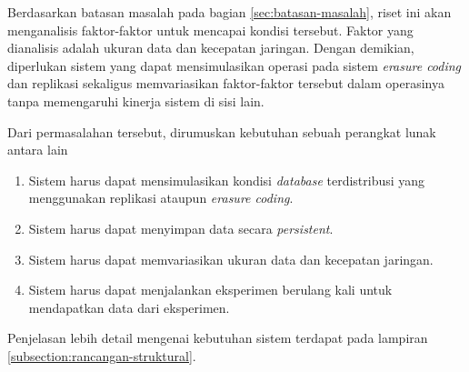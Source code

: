 Berdasarkan batasan masalah pada bagian \ref{sec:batasan-masalah}, riset ini akan menganalisis faktor-faktor untuk mencapai kondisi tersebut. Faktor yang dianalisis adalah ukuran data dan kecepatan jaringan. Dengan demikian, diperlukan sistem yang dapat mensimulasikan operasi pada sistem \textit{erasure coding} dan replikasi sekaligus memvariasikan faktor-faktor tersebut dalam operasinya tanpa memengaruhi kinerja sistem di sisi lain.

Dari permasalahan tersebut, dirumuskan kebutuhan sebuah perangkat lunak antara lain
\begin{enumerate}

    \item Sistem harus dapat mensimulasikan kondisi \textit{database} terdistribusi yang menggunakan replikasi ataupun \textit{erasure coding}.
    \item Sistem harus dapat menyimpan data secara \textit{persistent}.
    \item Sistem harus dapat memvariasikan ukuran data dan kecepatan jaringan.
    \item Sistem harus dapat menjalankan eksperimen berulang kali untuk mendapatkan data dari eksperimen.

\end{enumerate}

Penjelasan lebih detail mengenai kebutuhan sistem terdapat pada lampiran \ref{subsection:rancangan-struktural}.
